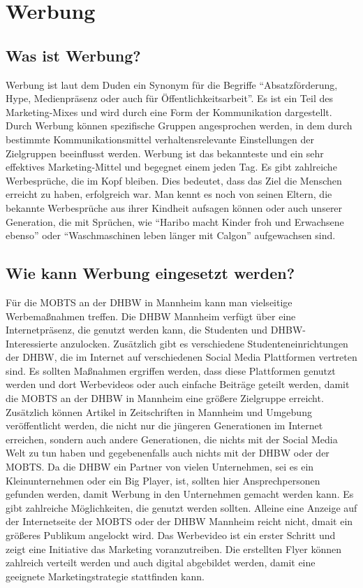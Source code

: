 \section{Werbung}
\subsection{Was ist Werbung?}
Werbung ist laut dem Duden ein Synonym für die Begriffe \enquote{Absatzförderung, Hype, Medienpräsenz oder auch für Öffentlichkeitsarbeit}. \autocite[Vgl.][]{DudenMB} Es ist ein Teil des Marketing-Mixes und wird durch eine Form der Kommunikation dargestellt. Durch Werbung können spezifische Gruppen angesprochen werden, in dem durch bestimmte Kommunikationsmittel verhaltensrelevante Einstellungen der Zielgruppen beeinflusst werden. Werbung ist das bekannteste und ein sehr effektives Marketing-Mittel und begegnet einem jeden Tag. \autocite[Vgl.][]{GablerMB} Es gibt zahlreiche Werbesprüche, die im Kopf bleiben. Dies bedeutet, dass das Ziel die Menschen erreicht zu haben, erfolgreich war. Man kennt es noch von seinen Eltern, die bekannte Werbesprüche aus ihrer Kindheit aufsagen können oder auch unserer Generation, die mit Sprüchen, wie \enquote{Haribo macht Kinder froh und Erwachsene ebenso} \autocite[Vgl.][]{HariboMB} oder \enquote{Waschmaschinen leben länger mit Calgon} \autocite[Vgl.][]{CalgonMB} aufgewachsen sind. 

\subsection{Wie kann Werbung eingesetzt werden?}
Für die MOBTS an der DHBW in Mannheim kann man vielseitige Werbemaßnahmen treffen. Die DHBW Mannheim verfügt über eine Internetpräsenz, die genutzt werden kann, die Studenten und DHBW-Interessierte anzulocken. Zusätzlich gibt es verschiedene Studenteneinrichtungen der DHBW, die im Internet auf verschiedenen Social Media Plattformen vertreten sind. Es sollten Maßnahmen ergriffen werden, dass diese Plattformen genutzt werden und dort Werbevideos oder auch einfache Beiträge geteilt werden, damit die MOBTS an der DHBW in Mannheim eine größere Zielgruppe erreicht. Zusätzlich können Artikel in Zeitschriften in Mannheim und Umgebung veröffentlicht werden, die nicht nur die jüngeren Generationen im Internet erreichen, sondern auch andere Generationen, die nichts mit der Social Media Welt zu tun haben und gegebenenfalls auch nichts mit der DHBW oder der MOBTS. Da die DHBW ein Partner von vielen Unternehmen, sei es ein Kleinunternehmen oder ein Big Player, ist, sollten hier Ansprechpersonen gefunden werden, damit Werbung in den Unternehmen gemacht werden kann. Es gibt zahlreiche Möglichkeiten, die genutzt werden sollten. Alleine eine Anzeige auf der Internetseite der MOBTS oder der DHBW Mannheim reicht nicht, dmait ein größeres Publikum angelockt wird. Das Werbevideo ist ein erster Schritt und zeigt eine Initiative das Marketing voranzutreiben. Die erstellten Flyer können zahlreich verteilt werden und auch digital abgebildet werden, damit eine geeignete Marketingstrategie stattfinden kann. 

